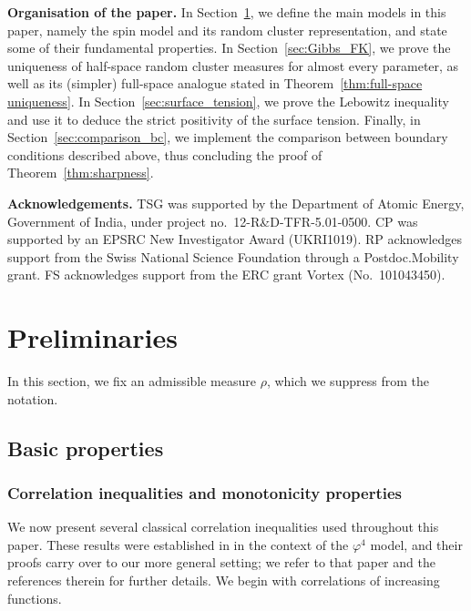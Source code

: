 \documentclass[11pt,a4paper]{article}
\numberwithin{equation}{section}
\theoremstyle{plain}
\theoremstyle{definition}
\begin{document}
\hfill 


\noindent \textbf{Organisation of the paper.} In Section~\ref{sec:preliminaries}, we define the main models in this paper, namely the spin model and its random cluster representation, and state some of their fundamental properties. In Section~\ref{sec:Gibbs_FK}, we prove the uniqueness of half-space random cluster measures for almost every parameter, as well as its (simpler) full-space analogue stated in Theorem~\ref{thm:full-space uniqueness}. In Section~\ref{sec:surface_tension}, we prove the Lebowitz inequality and use it to deduce the strict positivity of the surface tension. Finally, in Section~\ref{sec:comparison_bc}, we implement the comparison between boundary conditions described above, thus concluding the proof of Theorem~\ref{thm:sharpness}.

\hfill


\noindent \textbf{Acknowledgements.} TSG was supported by the Department of Atomic Energy, Government of India, under project no.\ 12-R\&D-TFR-5.01-0500. CP was supported by an EPSRC New Investigator Award (UKRI1019). RP acknowledges support from the Swiss National Science Foundation through a Postdoc.Mobility grant. FS acknowledges support
from the ERC grant Vortex (No.~101043450).


\section{Preliminaries}\label{sec:preliminaries}

In this section, we fix an admissible measure $\rho$, which we suppress from the notation.

\subsection{Basic properties}\label{sec:basics}

\subsubsection{Correlation inequalities and monotonicity properties}


We now present several classical correlation inequalities used throughout 
this paper. These results were established in 
\cite{GunaratnamPanagiotisPanisSeveroPhi42022} in the context of the 
$\varphi^4$ model, and their proofs carry over to our more general setting; 
we refer to that paper and the references therein for further details. We 
begin with correlations of increasing functions.
\end{document}
